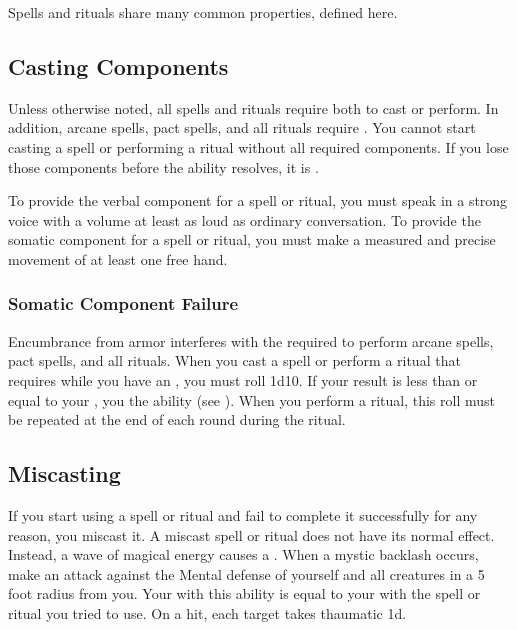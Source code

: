     Spells and rituals share many common properties, defined here.

    \subsection{Casting Components}\label{Casting Components}
        Unless otherwise noted, all spells and rituals require both  to cast or perform.
        In addition, arcane spells, pact spells, and all rituals require .
        You cannot start casting a spell or performing a ritual without all required components.
        If you lose those components before the ability resolves, it is .

        To provide the verbal component for a spell or ritual, you must speak in a strong voice with a volume at least as loud as ordinary conversation.
        To provide the somatic component for a spell or ritual, you must make a measured and precise movement of at least one free hand.

        \subsubsection{Somatic Component Failure}\label{Somatic Component Failure}
            Encumbrance from armor interferes with the  required to perform arcane spells, pact spells, and all rituals.
            When you cast a spell or perform a ritual that requires  while you have an , you must roll 1d10.
            If your result is less than or equal to your , you  the ability (see ).
            When you perform a ritual, this roll must be repeated at the end of each round during the ritual.

    \subsection{Miscasting}\label{Miscasting}

        If you start using a spell or ritual and fail to complete it successfully for any reason, you miscast it.
        A miscast spell or ritual does not have its normal effect.
        Instead, a wave of magical energy causes a .
        When a mystic backlash occurs, make an attack against the Mental defense of yourself and all creatures in a 5 foot radius from you.
        Your  with this ability is equal to your  with the spell or ritual you tried to use.
        On a hit, each target takes thaumatic  \minus1d.


